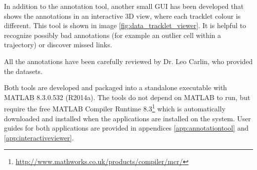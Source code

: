 		In addition to the annotation tool, another small GUI has been developed that shows the annotations in an interactive 3D view, where each tracklet colour is different. This tool is shown in image \cref{fig:data_tracklet_viewer}. It is helpful to recognize possibly bad annotations (for example an outlier cell within a trajectory) or discover missed links.
		
		All the annotations have been carefully reviewed by Dr. Leo Carlin, who provided the datasets.
		
		Both tools are developed and packaged into a standalone executable with MATLAB 8.3.0.532 (R2014a). The tools do not depend on MATLAB to run, but require the free MATLAB Compiler Runtime 8.3\footnote{\url{http://www.mathworks.co.uk/products/compiler/mcr/}} which is automatically downloaded and installed when the applications are installed on the system. User guides for both applications are provided in appendices \ref{app:annotationtool} and \ref{app:interactiveviewer}.